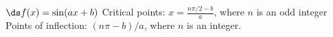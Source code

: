 {$\ds f(x) = \sin (ax+b)$
}
{Critical points: $x=\frac{n\pi/2-b}{a}$, where $n$ is an odd integer
Points of inflection: $(n\pi-b)/a$, where $n$ is an integer.
}
